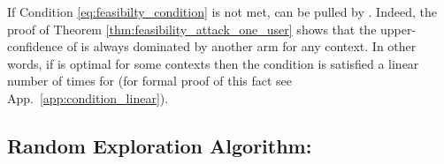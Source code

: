 
If Condition \eqref{eq:feasibilty_condition} is not met,  can be pulled by \linucb. Indeed, the proof of Theorem \ref{thm:feasibility_attack_one_user} shows that the upper-confidence of  is always dominated by another arm for any context. In other words, if  is optimal for some contexts then the condition is satisfied a linear number of times for \linucb (for formal proof of this fact see App.~\ref{app:condition_linear}).


 \subsection{Random Exploration Algorithm: \lints}

